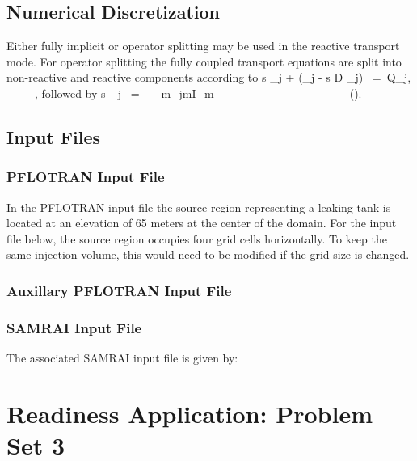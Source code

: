 \documentclass[12pt]{article}
\def\EQ#1\EN{\begin{equation}#1\end{equation}}
\newcommand{\eq}{\ =\ }
\newcommand{\p}{{\partial}}
\newcommand{\bnabla}{\boldsymbol{\nabla}}
\newcommand{\bq}{\boldsymbol{q}}
\begin{document}
\subsection{Numerical Discretization}

Either fully implicit or operator splitting may be used in the reactive transport mode. For operator splitting the fully coupled transport equations are split into non-reactive and reactive components according to
\EQ
\frac{\p}{\p t} \varphi s \Psi_j + \bnabla\cdot\big(\bq \Psi_j - \varphi s D \bnabla \Psi_j\big) \eq Q_j, \ \ \ \ \ ,
\EN
followed by
\EQ
\frac{d}{dt} \varphi s \Psi_j \eq - \sum_m\nu_{jm}I_m -  \ \ \ \ \ \ \ \ \ \ \ \ \ \ \ \ \ \ \ \ \ \ ().
\EN

\subsection{Input Files}

\subsubsection{PFLOTRAN Input File}

In the PFLOTRAN input file the source region representing a leaking tank is located at an elevation of 65 meters at the center of the domain. For the input file below, the source region occupies four grid cells horizontally. To keep the same injection volume, this would need to be modified if the grid size is changed.

\tiny

\normalsize

\subsubsection{Auxillary PFLOTRAN Input File}

\tiny

\normalsize

\subsubsection{SAMRAI Input File}

The associated SAMRAI input file is given by:

\tiny
%
\normalsize

\section{Readiness Application: Problem Set 3}
\end{document}
